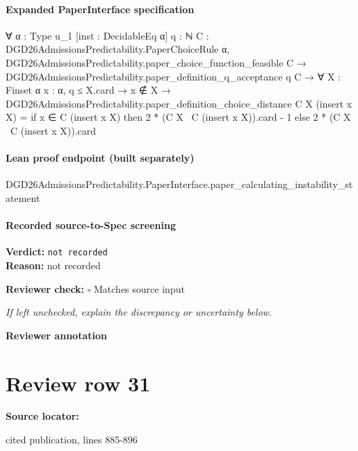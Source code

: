 \documentclass[10pt]{article}
\newcommand{\reviewerbox}{%
  \par\noindent\fbox{\parbox{0.96\linewidth}{\rule{0pt}{0.38in}}}\par
}
\newcommand{\reviewmatch}[1]{%
  \par\noindent\textbf{Reviewer check:} $\square$\; #1\par
  \noindent\emph{If left unchecked, explain the discrepancy or uncertainty below.}\par
}
\begin{document}
\paragraph{Expanded PaperInterface specification}
\begin{ReviewVerbatim}
∀ {α : Type u_1} [inst : DecidableEq α] {q : ℕ} {C : DGD26AdmissionsPredictability.PaperChoiceRule α},
  DGD26AdmissionsPredictability.paper_choice_function_feasible C →
    DGD26AdmissionsPredictability.paper_definition_q_acceptance q C →
      ∀ {X : Finset α} {x : α},
        q ≤ X.card →
          x ∉ X →
            DGD26AdmissionsPredictability.paper_definition_choice_distance C X (insert x X) =
              if x ∈ C (insert x X) then 2 * (C X \ C (insert x X)).card - 1 else 2 * (C X \ C (insert x X)).card
\end{ReviewVerbatim}

\paragraph{Lean proof endpoint (built separately)}\begin{ReviewVerbatim}
DGD26AdmissionsPredictability.PaperInterface.paper_calculating_instability_statement
\end{ReviewVerbatim}

\paragraph{Recorded source-to-Spec screening}
\textbf{Verdict:} \texttt{not recorded}
\\
\textbf{Reason:} not recorded
\reviewmatch{Matches source input}
\noindent\textbf{Reviewer annotation}\par
\reviewerbox
\clearpage
\hypertarget{source-claim-72ba750e0e18812e}{}
\section*{Review row 31}
\textbf{Source locator:} {\footnotesize\raggedright cited publication, lines 885-\allowbreak{}896\par}
\end{document}
